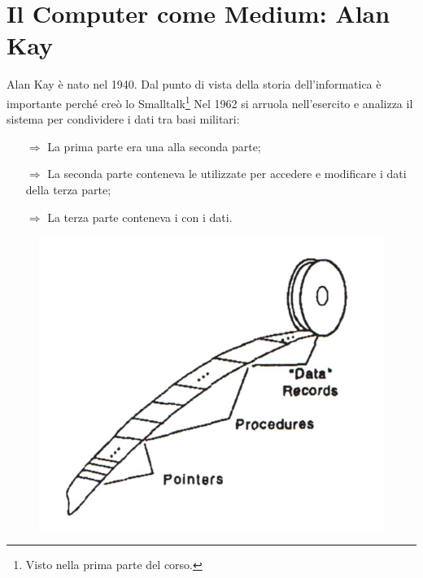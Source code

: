 
\section{Il Computer come Medium: Alan Kay}

Alan Kay è nato nel 1940. Dal punto di vista della storia dell'informatica è importante perché creò lo Smalltalk\footnote{Visto nella prima parte del corso.}
Nel 1962 si arruola nell'esercito e analizza il sistema per condividere i dati tra basi militari:

\begin{itemize}
    \item [$\Rightarrow$] La prima parte era una  alla seconda parte;
    \item [$\Rightarrow$] La seconda parte conteneva le  utilizzate per accedere e modificare i dati della terza parte;
    \item [$\Rightarrow$] La terza parte conteneva i  con i dati.
\end{itemize}

\begin{figure}[h]
    \centering
    \includegraphics[scale=0.5]{images/Data.png}
\end{figure}
\pagebreak
